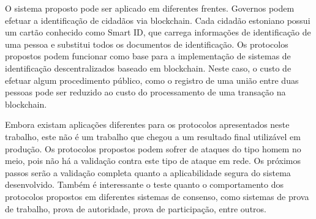 \documentclass[tcc,capa]{texufpel}
\begin{document}
    O sistema proposto pode ser aplicado em diferentes frentes. Governos podem efetuar a identificação de cidadãos via blockchain. Cada cidadão estoniano possui um cartão conhecido como Smart ID, que carrega informações de identificação de uma pessoa e substitui todos os documentos de identificação. Os protocolos propostos podem funcionar como base para a implementação de sistemas de identificação descentralizados baseado em blockchain. Neste caso, o custo de efetuar algum procedimento público, como o registro de uma união entre duas pessoas pode ser reduzido ao custo do processamento de uma transação na blockchain.
    
    Embora existam aplicações diferentes para os protocolos apresentados neste trabalho, este não é um trabalho que chegou a um resultado final utilizável em produção. Os protocolos propostos podem sofrer de ataques do tipo homem no meio, pois não há a validação contra este tipo de ataque em rede. Os próximos passos serão a validação completa quanto a aplicabilidade segura do sistema desenvolvido. Também é interessante o teste quanto o comportamento dos protocolos propostos em diferentes sistemas de consenso, como sistemas de prova de trabalho, prova de autoridade, prova de participação, entre outros.


 

%

\annex




\end{document}
